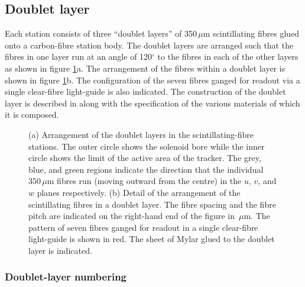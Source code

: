 \subsection{Doublet layer}
\label{SubSect:DblLyr}

Each station consists of three ``doublet layers'' of 350\,$\mu$m
scintillating fibres glued onto a carbon-fibre station body.  
The doublet layers are arranged such that the fibres in one layer run
at an angle of 120$^\circ$ to the fibres in each of the other layers as
shown in figure \ref{Fig:DblLyr}a.  
The arrangement of the fibres within a doublet layer is shown in figure
\ref{Fig:DblLyr}b.  
The configuration of the seven fibres ganged for readout via a
single clear-fibre light-guide is also indicated.
The construction of the doublet layer is described in
\cite{TrackerPaper} along with the specification of the various
materials of which it is composed.
\begin{figure}
  \caption{
    (a) Arrangement of the doublet layers in the scintillating-fibre
    stations.  
    The outer circle shows the solenoid bore while the inner circle
    shows the limit of the active area of the tracker.  
    The grey, blue, and green regions indicate the direction that the
    individual 350\,$\mu$m fibres run (moving outward from the centre) in
    the $u$, $v$, and $w$ planes respectively.  
    (b) Detail of the arrangement of the scintillating fibres in a
    doublet layer.  
    The fibre spacing and the fibre pitch are indicated on the
    right-hand end of the figure in \,$\mu$m.
    The pattern of seven fibres ganged for readout in a single
    clear-fibre light-guide is shown in red.
    The sheet of Mylar glued to the doublet layer is indicated.
  }
  \label{Fig:DblLyr}
\end{figure}

\subsubsection{Doublet-layer numbering}
\label{SubSubSect:DblNmbrng}

